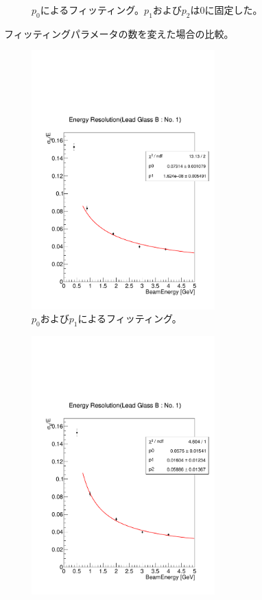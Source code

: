 \begin{figure}[H]
\begin{subfigure}{.5\textwidth}
\begin{center}
			\caption{$p_0$によるフィッティング。$p_1$および$p_2$は0に固定した。}
			\label{fig:sfig2}
		\end{center}
	\end{subfigure}
	\caption[フィッティングパラメータの数を変えた場合の比較]{フィッティングパラメータの数を変えた場合の比較。}
	\label{res_re_twopara}
\end{figure}

\begin{figure}[H]
	\begin{subfigure}{.5\textwidth}
		\begin{center}
 		 	\includegraphics[width=200pt]{./Figure/EBESAnalysis/res_re_twopara_without_low.pdf} 
			  \caption{$p_0$および$p_1$によるフィッティング。}
  			\label{fig:sfig1}
 		\end{center}
	\end{subfigure}
	\begin{subfigure}{.5\textwidth}
		\begin{center}
			\includegraphics[width=200pt]{./Figure/EBESAnalysis/res_re_threepara_without_low.pdf}%

\end{center}
\end{subfigure}
\end{figure}
